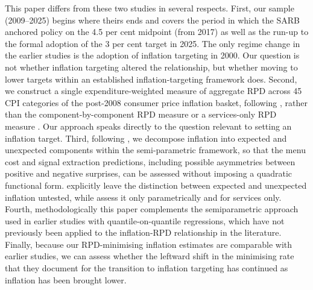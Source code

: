 \documentclass[
  letterpaper,
  DIV=11,
  numbers=noendperiod]{scrartcl}
\begin{document}
This paper differs from these two studies in several respects. First,
our sample (2009--2025) begins where theirs ends and covers the period
in which the SARB anchored policy on the 4.5 per cent midpoint (from
2017) as well as the run-up to the formal adoption of the 3 per cent
target in 2025. The only regime change in the earlier studies is the
adoption of inflation targeting in 2000. Our question is not whether
inflation targeting altered the relationship, but whether moving to
lower targets within an established inflation-targeting framework does.
Second, we construct a single expenditure-weighted measure of aggregate
RPD across 45 CPI categories of the post-2008 consumer price inflation
basket, following \citet{lach1992}, rather than the
component-by-component RPD measure \citep{ndou2014} or a services-only
RPD measure \citep{ndou2017}. Our approach speaks directly to the
question relevant to setting an inflation target. Third, following
\citet{caraballo2013}, we decompose inflation into expected and
unexpected components within the semi-parametric framework, so that the
menu cost and signal extraction predictions, including possible
asymmetries between positive and negative surprises, can be assessed
without imposing a quadratic functional form. \citet{ndou2014}
explicitly leave the distinction between expected and unexpected
inflation untested, while \citet{ndou2017} assess it only parametrically
and for services only. Fourth, methodologically this paper complements
the semiparametric approach used in earlier studies with
quantile-on-quantile regressions, which have not previously been applied
to the inflation-RPD relationship in the literature. Finally, because
our RPD-minimising inflation estimates are comparable with earlier
studies, we can assess whether the leftward shift in the minimising rate
that they document for the transition to inflation targeting has
continued as inflation has been brought lower.
\end{document}
